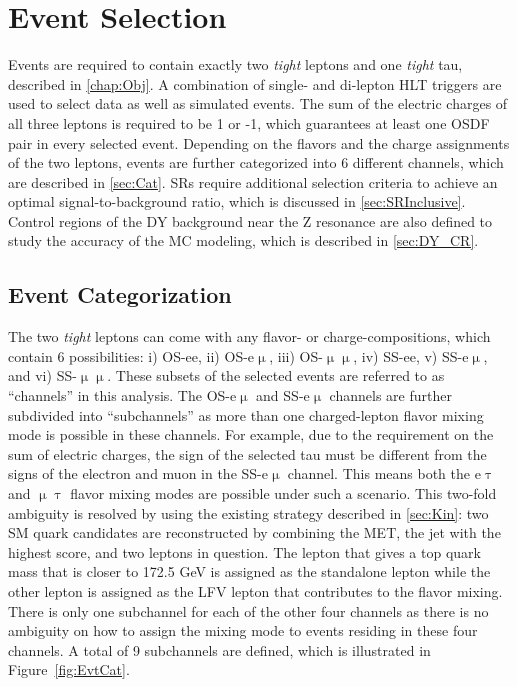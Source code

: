 \chapter{Event Selection}
\label{chap:Evt}

Events are required to contain exactly two \emph{tight} leptons and one \emph{tight} tau, described in \autoref{chap:Obj}. A combination of single- and di-lepton \ac{HLT} triggers are used to select data as well as simulated events. The sum of the electric charges of all three leptons is required to be 1 or -1, which guarantees at least one \ac{OSDF} pair in every selected event. Depending on the flavors and the charge assignments of the two leptons, events are further categorized into 6 different channels, which are described in \autoref{sec:Cat}. \acp{SR} require additional selection criteria to achieve an optimal signal-to-background ratio, which is discussed in \autoref{sec:SRInclusive}. Control regions of the \ac{DY} background near the Z resonance are also defined to study the accuracy of the \ac{MC} modeling, which is described in \autoref{sec:DY_CR}. 
\section{Event Categorization}
\label{sec:Cat}

The two \emph{tight} leptons can come with any flavor- or charge-compositions, which contain 6 possibilities: i) \ac{OS}-ee, ii) \ac{OS}-e$\upmu$, iii) \ac{OS}-$\upmu\upmu$, iv) \ac{SS}-ee, v) \ac{SS}-e$\upmu$, and vi) \ac{SS}-$\upmu\upmu$. These subsets of the selected events are referred to as ``channels'' in this analysis. The \ac{OS}-e$\upmu$ and \ac{SS}-e$\upmu$ channels are further subdivided into ``subchannels'' as more than one charged-lepton flavor mixing mode is possible in these channels. For example, due to the requirement on the sum of electric charges, the sign of the selected tau must be different from the signs of the electron and muon in the \ac{SS}-e$\upmu$ channel. This means both the e$\uptau$ and $\upmu\uptau$ flavor mixing modes are possible under such a scenario. This two-fold ambiguity is resolved by using the existing strategy described in \autoref{sec:Kin}: two \ac{SM} quark candidates are reconstructed by combining the \ac{MET}, the jet with the highest \DeepJ score, and two leptons in question. The lepton that gives a top quark mass that is closer to 172.5 GeV is assigned as the standalone lepton while the other lepton is assigned as the LFV lepton that contributes to the flavor mixing. There is only one subchannel for each of the other four channels as there is no ambiguity on how to assign the mixing mode to events residing in these four channels. A total of 9 subchannels are defined, which is illustrated in Figure~\ref{fig:EvtCat}. 

